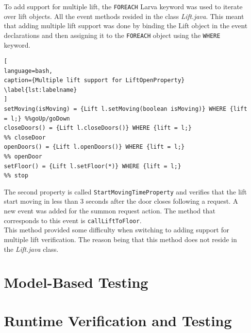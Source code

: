 \documentclass[a4paper, 12pt]{article}
\begin{document}
To add support for multiple lift, the \texttt{FOREACH} Larva keyword was used to iterate over lift objects. All the event methods resided in the class \textit{Lift.java}. This meant that adding multiple lift support was done by binding the Lift object in the event declarations and then assigning it to the \texttt{FOREACH} object using the \texttt{WHERE} keyword.

\begin{adjustbox}{max width=\textwidth}

\begin{lstlisting}[
language=bash, 
caption={Multiple lift support for LiftOpenProperty}
\label{lst:labelname}
]
setMoving(isMoving) = {Lift l.setMoving(boolean isMoving)} WHERE {lift = l;} %%goUp/goDown
closeDoors() = {Lift l.closeDoors()} WHERE {lift = l;}					%% closeDoor
openDoors() = {Lift l.openDoors()} WHERE {lift = l;}					%% openDoor
setFloor() = {Lift l.setFloor(*)} WHERE {lift = l;}						%% stop
\end{lstlisting}

\end{adjustbox}



The second property is called \texttt{StartMovingTimeProperty} and verifies that the lift start moving in less than 3 seconds after the door closes following a request. A new event was added for the summon request action. The method that corresponds to this event is \texttt{callLiftToFloor}. \\

This method provided some difficulty when switching to adding support for multiple lift verification. The reason being that this method does not reside in the \textit{Lift.java} class. 

\section{Model-Based Testing}

\section{Runtime Verification and Testing}


 
\end{document}
